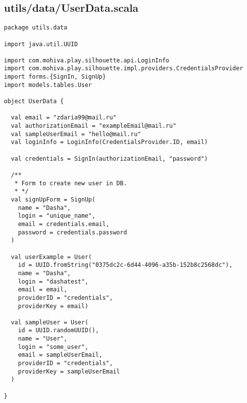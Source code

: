 \subsection{utils/data/UserData.scala}
\begin{lstlisting}
package utils.data

import java.util.UUID

import com.mohiva.play.silhouette.api.LoginInfo
import com.mohiva.play.silhouette.impl.providers.CredentialsProvider
import forms.{SignIn, SignUp}
import models.tables.User

object UserData {

  val email = "zdaria99@mail.ru"
  val authorizationEmail = "exampleEmail@mail.ru"
  val sampleUserEmail = "hello@mail.ru"
  val loginInfo = LoginInfo(CredentialsProvider.ID, email)

  val credentials = SignIn(authorizationEmail, "password")

  /**
   * Form to create new user in DB.
   * */
  val signUpForm = SignUp(
    name = "Dasha",
    login = "unique_name",
    email = credentials.email,
    password = credentials.password
  )

  val userExample = User(
    id = UUID.fromString("0375dc2c-6d44-4096-a35b-152b8c2568dc"),
    name = "Dasha",
    login = "dashatest",
    email = email,
    providerID = "credentials",
    providerKey = email)

  val sampleUser = User(
    id = UUID.randomUUID(),
    name = "User",
    login = "some_user",
    email = sampleUserEmail,
    providerID = "credentials",
    providerKey = sampleUserEmail
  )

}
\end{lstlisting}
